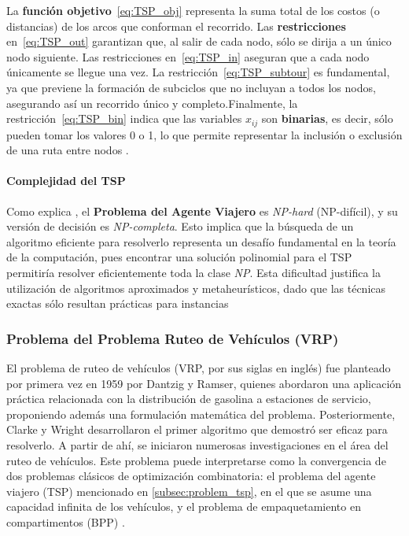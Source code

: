 \documentclass[12pt,titlepage,twoside,openright]{book}
\begin{document}
La \textbf{función objetivo}~\eqref{eq:TSP_obj} representa la suma total de los costos (o distancias) de los arcos que conforman el recorrido. Las \textbf{restricciones} en~\eqref{eq:TSP_out} garantizan que, al salir de cada nodo, sólo se dirija a un único nodo siguiente. Las restricciones en~\eqref{eq:TSP_in} aseguran que a cada nodo únicamente se llegue una vez. La restricción~\eqref{eq:TSP_subtour} es fundamental, ya que previene la formación de subciclos que no incluyan a todos los nodos, asegurando así un recorrido único y completo.Finalmente, la restricción~\eqref{eq:TSP_bin} indica que las variables \(x_{ij}\) son \textbf{binarias}, es decir, sólo pueden tomar los valores 0 o 1, lo que permite representar la inclusión o exclusión de una ruta entre nodos \citep{torres2018}.

\paragraph{Complejidad del TSP}

Como explica \cite{papadimitriou1998}, el \textbf{Problema del Agente Viajero} es \textit{NP-hard} (NP-difícil), y su versión de decisión es \textit{NP-completa}. Esto implica que la búsqueda de un algoritmo eficiente para resolverlo representa un desafío fundamental en la teoría de la computación, pues encontrar una solución polinomial para el TSP permitiría resolver eficientemente toda la clase \textit{NP}. Esta dificultad justifica la utilización de algoritmos aproximados y metaheurísticos, dado que las técnicas exactas sólo resultan prácticas para instancias

\subsubsection{Problema del Problema Ruteo de Vehículos (VRP)}
El problema de ruteo de vehículos (VRP, por sus siglas en inglés) fue planteado por primera vez en 1959 por Dantzig y Ramser, quienes abordaron una aplicación práctica relacionada con la distribución de gasolina a estaciones de servicio, proponiendo además una formulación matemática del problema. Posteriormente, Clarke y Wright desarrollaron el primer algoritmo que demostró ser eficaz para resolverlo. A partir de ahí, se iniciaron numerosas investigaciones en el área del ruteo de vehículos. Este problema puede interpretarse como la convergencia de dos problemas clásicos de optimización combinatoria: el problema del agente viajero (TSP) mencionado en \autoref{subsec:problem_tsp}, en el que se asume una capacidad infinita de los vehículos, y el problema de empaquetamiento en compartimentos (BPP) \cite{daza2009}.
\end{document}

